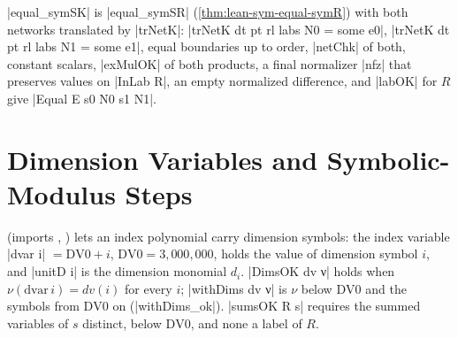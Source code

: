\begin{theorem}\label{thm:lean-sym-equal-symSK}
\lean|equal_symSK| is \lean|equal_symSR| (\cref{thm:lean-sym-equal-symR}) with both networks translated by \lean|trNetK|: \lean|trNetK dt pt rl labs N0 = some e0|, \lean|trNetK dt pt rl labs N1 = some e1|, equal boundaries up to order, \lean|netChk| of both, constant scalars, \lean|exMulOK| of both products, a final normalizer \lean|nfz| that preserves values on \lean|InLab R|, an empty normalized difference, and \lean|labOK| for $R$ give \lean|Equal E s0 N0 s1 N1|.
\end{theorem}

\section{Dimension Variables and Symbolic-Modulus Steps}\label{sec:lean-sym-dig}

 (imports , ) lets an index polynomial carry dimension symbols: the index variable \lean|dvar i| $=\mathrm{DV0}+i$, $\mathrm{DV0}=3{,}000{,}000$, holds the value of dimension symbol $i$, and \lean|unitD i| is the dimension monomial $d_i$. \lean|DimsOK dv ν| holds when $\nu(\mathrm{dvar}\,i)=dv(i)$ for every $i$; \lean|withDims dv ν| is $\nu$ below $\mathrm{DV0}$ and the symbols from $\mathrm{DV0}$ on (\lean|withDims_ok|). \lean|sumsOK R s| requires the summed variables of $s$ distinct, below $\mathrm{DV0}$, and none a label of $R$.

